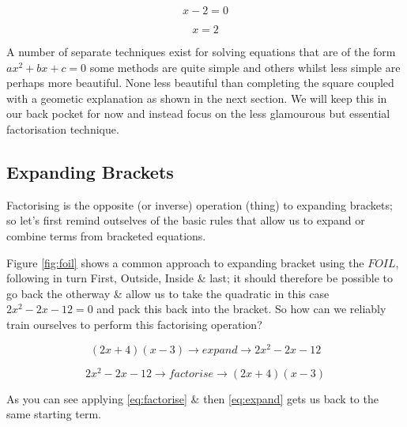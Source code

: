 \begin{equation} \label{eq:linear1}
 x  - 2 = 0
\end{equation}

\begin{equation} \label{eq:linear2}
 x  = 2
\end{equation}

A number of separate techniques exist for solving equations that are of the form $ ax^{2} +bx + c = 0 $ some methods are quite simple and others whilst less simple are perhaps more beautiful. None less beautiful than completing the square coupled with a geometic explanation as shown in the next section. We will keep this in our back pocket for now and instead focus on the less glamourous but essential factorisation technique.

\subsection{Expanding Brackets}

Factorising is the opposite (or inverse) operation (thing) to expanding brackets; so let's first remind outselves of the basic rules that allow us to expand or combine terms from bracketed equations. 

Figure \ref{fig:foil} shows a common approach to expanding bracket using the $FOIL$, following in turn First, Outside, Inside \& last; it should therefore be possible to go back the otherway \& allow us to take the quadratic in this case $ 2x^{2} -2x - 12 = 0 $ and pack this back into the bracket. So how can we reliably train ourselves to perform this factorising operation?

\begin{equation} \label{eq:factorise}
  \left ( 2 x + 4 \right) \left ( x - 3 \right ) \rightarrow expand \rightarrow 2x^{2} -2x - 12
\end{equation}

\begin{equation} \label{eq:expand}
  2x^{2} -2x - 12 \rightarrow factorise \rightarrow \left ( 2 x + 4 \right) \left ( x - 3 \right )
\end{equation}

As you can see applying \ref{eq:factorise} \& then \ref{eq:expand} gets us back to the same starting term.

